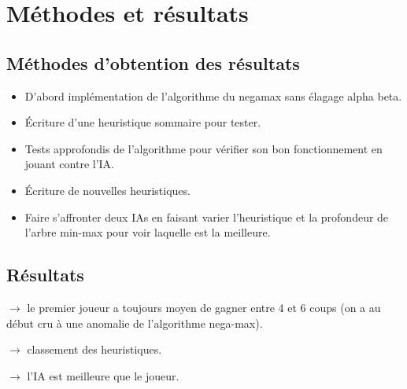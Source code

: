 \chapter{Méthodes et résultats} \label{chapter:methodes-resultats}

\section{Méthodes d'obtention des résultats}

\begin{itemize}
    \item D'abord implémentation de l'algorithme du negamax sans élagage alpha beta.
    \item Écriture d'une heuristique sommaire pour tester.
    \item Tests approfondis de l'algorithme pour vérifier son bon fonctionnement en jouant contre l'IA.
    \item Écriture de nouvelles heuristiques.
    \item Faire s'affronter deux IAs en faisant varier l'heuristique et la profondeur de l'arbre min-max pour voir laquelle est
        la meilleure.
\end{itemize}

\section{Résultats}

\(\rightarrow\) le premier joueur a toujours moyen de gagner entre 4 et 6 coups
(on a au début cru à une anomalie de l'algorithme nega-max).

\(\rightarrow\) classement des heuristiques.

\(\rightarrow\) l'IA est meilleure que le joueur.

